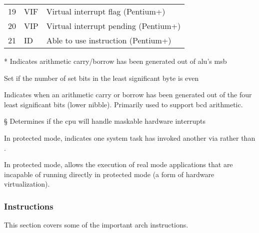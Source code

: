 \begin{table*}
\begin{threeparttable}
\begin{tabular}{rAl}
      19 & VIF & Virtual interrupt flag (Pentium+) \\
      20 & VIP & Virtual interrupt pending (Pentium+) \\
      21 & ID & Able to use  instruction (Pentium+) \\
      \bottomrule
    \end{tabular}
      \begin{tablenotes}
        \item[*] Indicates arithmetic carry/borrow has been generated out of \ac{alu}'s
          \ac{msb}
        \item[\dag] Set if the number of set bits in the least significant byte is even
        \item[\ddag] Indicates when an arithmetic carry or borrow has been generated
          out of the four least significant bits (lower nibble).
          Primarily used to support \ac{bcd} arithmetic.
        \item[\S] Determines if the \ac{cpu} will handle maskable hardware interrupts
        \item[\textbardbl] In protected mode, indicates one system task
          has invoked another via  rather than .
        \item[\textpilcrow] In protected mode, allows the execution of real mode
          applications that are incapable of running directly in protected mode
          (a form of hardware virtualization).
      \end{tablenotes}
  \end{threeparttable}
\end{table*}

\subsubsection{Instructions}
This section covers some of the important \gls{arch} instructions.

